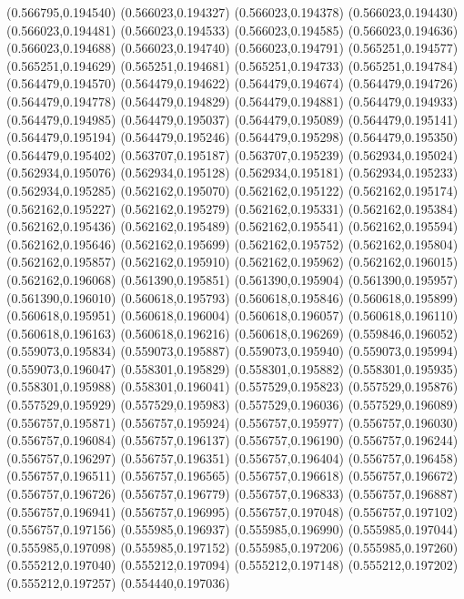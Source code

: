 (0.566795,0.194540)
(0.566023,0.194327)
(0.566023,0.194378)
(0.566023,0.194430)
(0.566023,0.194481)
(0.566023,0.194533)
(0.566023,0.194585)
(0.566023,0.194636)
(0.566023,0.194688)
(0.566023,0.194740)
(0.566023,0.194791)
(0.565251,0.194577)
(0.565251,0.194629)
(0.565251,0.194681)
(0.565251,0.194733)
(0.565251,0.194784)
(0.564479,0.194570)
(0.564479,0.194622)
(0.564479,0.194674)
(0.564479,0.194726)
(0.564479,0.194778)
(0.564479,0.194829)
(0.564479,0.194881)
(0.564479,0.194933)
(0.564479,0.194985)
(0.564479,0.195037)
(0.564479,0.195089)
(0.564479,0.195141)
(0.564479,0.195194)
(0.564479,0.195246)
(0.564479,0.195298)
(0.564479,0.195350)
(0.564479,0.195402)
(0.563707,0.195187)
(0.563707,0.195239)
(0.562934,0.195024)
(0.562934,0.195076)
(0.562934,0.195128)
(0.562934,0.195181)
(0.562934,0.195233)
(0.562934,0.195285)
(0.562162,0.195070)
(0.562162,0.195122)
(0.562162,0.195174)
(0.562162,0.195227)
(0.562162,0.195279)
(0.562162,0.195331)
(0.562162,0.195384)
(0.562162,0.195436)
(0.562162,0.195489)
(0.562162,0.195541)
(0.562162,0.195594)
(0.562162,0.195646)
(0.562162,0.195699)
(0.562162,0.195752)
(0.562162,0.195804)
(0.562162,0.195857)
(0.562162,0.195910)
(0.562162,0.195962)
(0.562162,0.196015)
(0.562162,0.196068)
(0.561390,0.195851)
(0.561390,0.195904)
(0.561390,0.195957)
(0.561390,0.196010)
(0.560618,0.195793)
(0.560618,0.195846)
(0.560618,0.195899)
(0.560618,0.195951)
(0.560618,0.196004)
(0.560618,0.196057)
(0.560618,0.196110)
(0.560618,0.196163)
(0.560618,0.196216)
(0.560618,0.196269)
(0.559846,0.196052)
(0.559073,0.195834)
(0.559073,0.195887)
(0.559073,0.195940)
(0.559073,0.195994)
(0.559073,0.196047)
(0.558301,0.195829)
(0.558301,0.195882)
(0.558301,0.195935)
(0.558301,0.195988)
(0.558301,0.196041)
(0.557529,0.195823)
(0.557529,0.195876)
(0.557529,0.195929)
(0.557529,0.195983)
(0.557529,0.196036)
(0.557529,0.196089)
(0.556757,0.195871)
(0.556757,0.195924)
(0.556757,0.195977)
(0.556757,0.196030)
(0.556757,0.196084)
(0.556757,0.196137)
(0.556757,0.196190)
(0.556757,0.196244)
(0.556757,0.196297)
(0.556757,0.196351)
(0.556757,0.196404)
(0.556757,0.196458)
(0.556757,0.196511)
(0.556757,0.196565)
(0.556757,0.196618)
(0.556757,0.196672)
(0.556757,0.196726)
(0.556757,0.196779)
(0.556757,0.196833)
(0.556757,0.196887)
(0.556757,0.196941)
(0.556757,0.196995)
(0.556757,0.197048)
(0.556757,0.197102)
(0.556757,0.197156)
(0.555985,0.196937)
(0.555985,0.196990)
(0.555985,0.197044)
(0.555985,0.197098)
(0.555985,0.197152)
(0.555985,0.197206)
(0.555985,0.197260)
(0.555212,0.197040)
(0.555212,0.197094)
(0.555212,0.197148)
(0.555212,0.197202)
(0.555212,0.197257)
(0.554440,0.197036)
